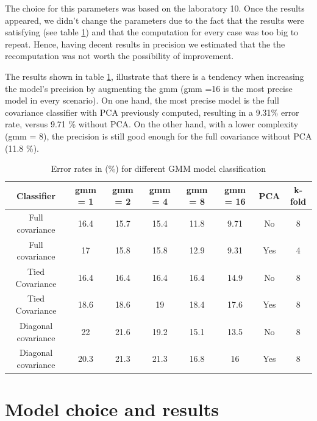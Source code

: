 \documentclass[twoside,a4paper,12pt]{report}
\begin{document}
The choice for this parameters was based on the laboratory 10. Once the results appeared,
we didn't change the parameters due to the fact that the results were satisfying (see table \ref{errorRatesGMMs})
and that the computation for every case was too big to repeat. Hence, having
decent results in precision we estimated that the the recomputation was not worth the 
possibility of improvement.

The results shown in table \ref{errorRatesGMMs}, illustrate that there is a tendency 
when increasing the model's precision by augmenting the gmm (gmm =16 is the most precise model
in every scenario). On one hand, the most precise model is the full covariance classifier with PCA previously computed,
resulting in a 9.31\% error rate, versus 9.71 \% without PCA. On the other hand, with a lower complexity (gmm = 8),
the precision is still good enough for the full covariance without PCA (11.8 \%).


\begin{table}
    \centering
     \begin{tabular}{||c c c c c c c c||} 
        \hline \hline
        Classifier & gmm = 1 & gmm = 2 & gmm = 4 & gmm = 8 &gmm = 16 & PCA & k-fold\\
        \hline\hline
        Full covariance &  16.4 &  15.7 &  15.4 & \cellcolor{blue!25}  11.8 & \cellcolor{blue!25} 9.71 & No & 8  \\ 
        \hline
        Full covariance &  17 &  15.8 &  15.8 &  12.9 & \cellcolor{blue!25} 9.31 & Yes & 4  \\ 
        \hline
        Tied Covariance &  16.4 &  16.4 & 16.4 &  16.4 & 14.9  & No & 8  \\
        \hline
        Tied Covariance &  18.6 &  18.6 & 19 &  18.4 & 17.6  & Yes & 8  \\
        \hline
        Diagonal covariance  &  22 &  21.6 & 19.2 &  15.1 & 13.5  & No & 8 \\
        \hline
        Diagonal covariance &20.3 &  21.3 & 21.3&  16.8  & 16 & Yes & 8\\
        \hline \hline
    \end{tabular}
    \label{errorRatesGMMs}
    \caption{Error rates in (\%) for different GMM model classification}
    \end{table}

    

\section{Model choice and results}
\end{document}

